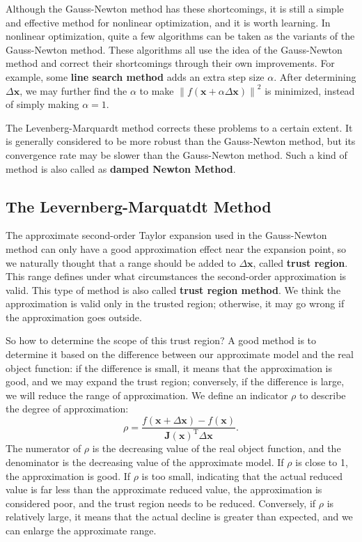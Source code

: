 Although the Gauss-Newton method has these shortcomings, it is still a simple and effective method for nonlinear optimization, and it is worth learning. In nonlinear optimization, quite a few algorithms can be taken as the variants of the Gauss-Newton method. These algorithms all use the idea of the Gauss-Newton method and correct their shortcomings through their own improvements. For example, some \textbf{line search method} adds an extra step size $\alpha$. After determining $\Delta \bm{x}$, we may further find the $\alpha$ to make $\left\| f (\bm{x} + \alpha \Delta \bm{ x}) \right\|^2$ is minimized, instead of simply making $\alpha = 1$.

The Levenberg-Marquardt method corrects these problems to a certain extent. It is generally considered to be more robust than the Gauss-Newton method, but its convergence rate may be slower than the Gauss-Newton method. Such a kind of method is also called as \textbf{damped Newton Method}.

\subsection{The Levernberg-Marquatdt Method}
The approximate second-order Taylor expansion used in the Gauss-Newton method can only have a good approximation effect near the expansion point, so we naturally thought that a range should be added to $\Delta \bm{x}$, called \textbf{trust region}. This range defines under what circumstances the second-order approximation is valid. This type of method is also called \textbf{trust region method}. We think the approximation is valid only in the trusted region; otherwise, it may go wrong if the approximation goes outside.

So how to determine the scope of this trust region? A good method is to determine it based on the difference between our approximate model and the real object function: if the difference is small, it means that the approximation is good, and we may expand the trust region; conversely, if the difference is large, we will reduce the range of approximation. We define an indicator $\rho$ to describe the degree of approximation:
\begin{equation}\label{eq:6.24}
	\rho = \frac{{f\left( {\bm{x} + \Delta \bm{x}} \right)}-{{ {f\left( \bm{x} \right)} }}} {\bm{J}\left( \bm{x} \right)^\mathrm{T} \Delta \bm{x}}.
\end{equation}
The numerator of $\rho$ is the decreasing value of the real object function, and the denominator is the decreasing value of the approximate model. If $\rho$ is close to 1, the approximation is good. If $\rho$ is too small, indicating that the actual reduced value is far less than the approximate reduced value, the approximation is considered poor, and the trust region needs to be reduced. Conversely, if $\rho$ is relatively large, it means that the actual decline is greater than expected, and we can enlarge the approximate range.

